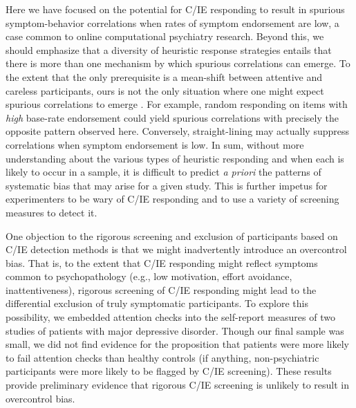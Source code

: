 \documentclass[a4paper,notitlepage,12pt]{article}
\begin{document}
\begin{refsection}[main]
Here we have focused on the potential for C/IE responding to result in spurious symptom-behavior correlations when rates of symptom endorsement are low, a case common to online computational psychiatry research. Beyond this, we should emphasize that a diversity of heuristic response strategies entails that there is more than one mechanism by which spurious correlations can emerge. To the extent that the only prerequisite is a mean-shift between attentive and careless participants, ours is not the only situation where one might expect spurious correlations to emerge \cite{huang2015insufficient}. For example, random responding on items with \emph{high} base-rate endorsement could yield spurious correlations with precisely the opposite pattern observed here. Conversely, straight-lining may actually suppress correlations when symptom endorsement is low. In sum, without more understanding about the various types of heuristic responding and when each is likely to occur in a sample, it is difficult to predict {\it a priori} the patterns of systematic bias that may arise for a given study. This is further impetus for experimenters to be wary of C/IE responding and to use a variety of screening measures to detect it. 

One objection to the rigorous screening and exclusion of participants based on C/IE detection methods is that we might inadvertently introduce an overcontrol bias. That is, to the extent that C/IE responding might reflect symptoms common to psychopathology (e.g., low motivation, effort avoidance, inattentiveness), rigorous screening of C/IE responding might lead to the differential exclusion of truly symptomatic participants. To explore this possibility, we embedded attention checks into the self-report measures of two studies of patients with major depressive disorder. Though our final sample was small, we did not find evidence for the proposition that patients were more likely to fail attention checks than healthy controls (if anything, non-psychiatric participants were more likely to be flagged by C/IE screening). These results provide preliminary evidence that rigorous C/IE screening is unlikely to result in overcontrol bias.


\end{refsection}
\end{document}
